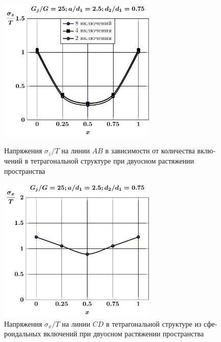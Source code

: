\begin{russian}
\begin{figure}[h!]
\centering\footnotesize
\parbox[b]{7.5cm}{\centering\includegraphics[width=7.5cm]{inc8-4-2-a25-d75-g25-sig_z-spheroids-tension2.pdf}
\caption{Напряжения $\sigma_z/T$ на линии $AB$ в зависимости от количества включений в тетрагональной структуре при двуосном растяжении пространства
\label{f:9:25}}}\hfil\hfil
\parbox[b]{7.5cm}{\centering\includegraphics[width=7.5cm]{inc8-a25-d75-g25-c-c-sig_x-spheroids-tension2.pdf}
\caption{Напряжения $\sigma_x/T$ на линии $CD$ в тетрагональной структуре из сфероидальных включений при двуосном растяжении пространства
\label{f:9:26}}}
\end{figure}

%


\end{russian}
